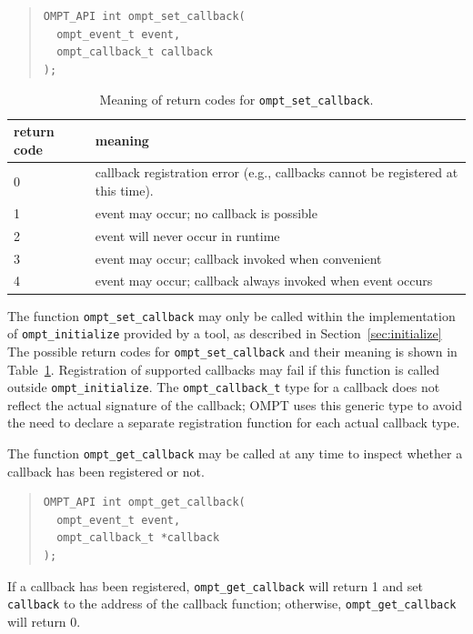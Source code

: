 \documentclass{article}
\begin{document}
\begin{quote}
\begin{verbatim}
OMPT_API int ompt_set_callback(
  ompt_event_t event, 
  ompt_callback_t callback
);
\end{verbatim}
\end{quote}


\begin{table}
\centering
\begin{tabular}{|l|l|}
\hline
return code & meaning \\\hline
0 & callback registration error (e.g., callbacks cannot be registered at this time).\\\hline
1 & event may occur; no callback is possible\\\hline
2 & event will never occur in runtime\\\hline
3 & event may occur; callback invoked when convenient\\\hline
4 & event may occur; callback always invoked when event occurs\\\hline
\end{tabular}
\caption{Meaning of return codes for {\tt ompt\_set\_callback}.}
\label{table:set_rc}
\end{table}

\noindent
The  function \verb|ompt_set_callback|  may only be called within the implementation of 
 \verb|ompt_initialize| provided by a  tool, as described in Section~\ref{sec:initialize}
The possible return codes for \verb|ompt_set_callback| and their meaning is shown in Table~\ref{table:set_rc}. 
Registration of supported callbacks may fail if this function is
called outside  \verb|ompt_initialize|.
The \verb|ompt_callback_t| type for a callback does not reflect the actual signature of the callback; OMPT uses  this generic type 
 to avoid the need to declare a separate registration function for each actual callback type.


The  function \verb|ompt_get_callback| may be called at any time to inspect whether a callback has been registered or not. 

\begin{quote}
\begin{verbatim}
OMPT_API int ompt_get_callback(
  ompt_event_t event, 
  ompt_callback_t *callback
);
\end{verbatim}
\end{quote}

\noindent
If a callback has been registered,  \verb|ompt_get_callback|  will return 1 and set {\tt callback} to the address of the callback function; otherwise, \verb|ompt_get_callback| will return 0.
\end{document}
